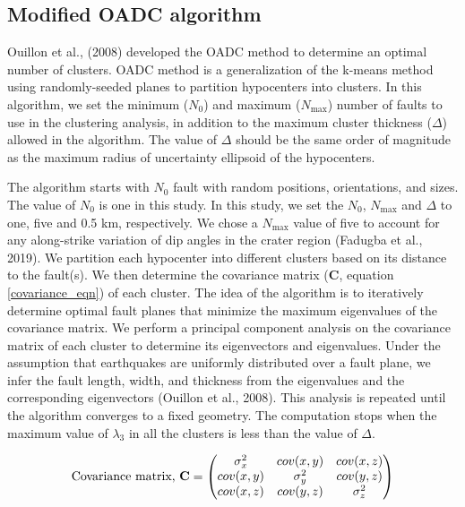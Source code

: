 \documentclass[draft]{agujournal2018}
\begin{document}
 
\subsection{Modified OADC algorithm}
Ouillon et al., (2008) developed the OADC method to determine an optimal number of clusters. OADC method is a generalization of the k-means method using randomly-seeded planes to partition hypocenters into clusters. In this algorithm, we set the minimum ($N_0$) and maximum ($N_{\max}$) number of faults to use in the clustering analysis, in addition to the maximum cluster thickness ($\Delta$) allowed in the algorithm. The value of $\Delta$ should be the same order of magnitude as the maximum radius of uncertainty ellipsoid of the hypocenters. 

The algorithm starts with $N_0$ fault with random positions, orientations, and sizes. The value of $N_0$ is one in this study. In this study, we set the $N_0$, $N_{\max}$ and $\Delta$ to one, five and 0.5 km, respectively. We chose a $N_{\max}$ value of five to account for any along-strike variation of dip angles in the crater region (Fadugba et al., 2019). We partition each hypocenter into different clusters based on its distance to the fault(s). We then determine the covariance matrix (\textbf{C}, equation \ref{covariance_eqn}) of each cluster. The idea of the algorithm is to iteratively determine optimal fault planes that minimize the maximum eigenvalues of the covariance matrix. We perform a principal component analysis on the covariance matrix of each cluster to determine its eigenvectors and eigenvalues. Under the assumption that earthquakes are uniformly distributed over a fault plane, we infer the fault length, width, and thickness from the eigenvalues and the corresponding eigenvectors (Ouillon et al., 2008). This analysis is repeated until the algorithm converges to a fixed geometry. The computation stops when the maximum value of $\lambda_{3}$ in all the clusters is less than the value of $\Delta$. 

\begin{equation}\label{covariance_eqn}
\text{Covariance matrix, \textbf{C}} = \begin{pmatrix} 
\sigma_{x}^2 &  cov(x,y) & cov(x,z)\\ 
cov(x,y) & \sigma_{y}^2 & cov(y,z)\\ 
cov(x,z) & cov(y,z) & \sigma_{z}^2
\end{pmatrix}
\end{equation}
\end{document}
